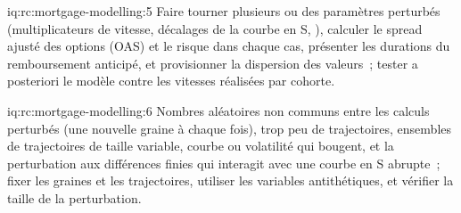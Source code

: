 \begin{solution}{iq:rc:mortgage-modelling:5}
Faire tourner plusieurs  ou des paramètres perturbés (multiplicateurs de vitesse, décalages de la courbe en S,
), calculer le spread ajusté des options (OAS) et le risque dans chaque cas, présenter les durations du
remboursement anticipé, et provisionner la dispersion des valeurs~; tester a posteriori le modèle contre les vitesses
réalisées par cohorte.
\end{solution}

\begin{solution}{iq:rc:mortgage-modelling:6}
Nombres aléatoires non communs entre les calculs perturbés (une nouvelle graine à chaque fois), trop peu de trajectoires,
ensembles de trajectoires de taille variable, courbe ou volatilité qui bougent, et la
perturbation aux différences finies qui interagit avec une courbe en S abrupte~; fixer les graines et les trajectoires, utiliser les variables antithétiques, et vérifier la
taille de la perturbation.
\end{solution}
